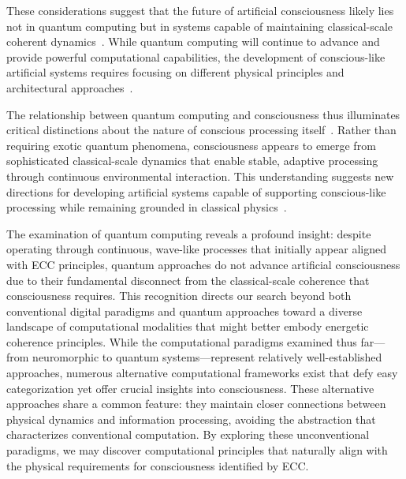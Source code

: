 These considerations suggest that the future of artificial consciousness likely lies not in quantum computing but in systems capable of maintaining classical-scale coherent dynamics~\cite{Bernstein2018,seth2024conscious}. While quantum computing will continue to advance and provide powerful computational capabilities, the development of conscious-like artificial systems requires focusing on different physical principles and architectural approaches~\cite{Deutsch2020,butlin2023consciousnessartificialintelligenceinsights}.

The relationship between quantum computing and consciousness thus illuminates critical distinctions about the nature of conscious processing itself~\cite{DiVincenzo2019,nagel1980like}. Rather than requiring exotic quantum phenomena, consciousness appears to emerge from sophisticated classical-scale dynamics that enable stable, adaptive processing through continuous environmental interaction. This understanding suggests new directions for developing artificial systems capable of supporting conscious-like processing while remaining grounded in classical physics~\cite{hunt2024electromagnetic,damasio2006descartes}.

The examination of quantum computing reveals a profound insight: despite operating through continuous, wave-like processes that initially appear aligned with ECC principles, quantum approaches do not advance artificial consciousness due to their fundamental disconnect from the classical-scale coherence that consciousness requires. This recognition directs our search beyond both conventional digital paradigms and quantum approaches toward a diverse landscape of computational modalities that might better embody energetic coherence principles. While the computational paradigms examined thus far—from neuromorphic to quantum systems—represent relatively well-established approaches, numerous alternative computational frameworks exist that defy easy categorization yet offer crucial insights into consciousness. These alternative approaches share a common feature: they maintain closer connections between physical dynamics and information processing, avoiding the abstraction that characterizes conventional computation. By exploring these unconventional paradigms, we may discover computational principles that naturally align with the physical requirements for consciousness identified by ECC.
